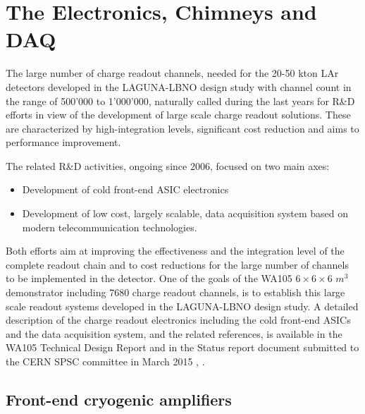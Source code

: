 \section{The Electronics, Chimneys and DAQ}
\label{sec:detectors-fd-alt-elec}

The large number of charge readout channels, needed for the 20-50 kton LAr detectors developed in the LAGUNA-LBNO design study  with channel count in the range of 500'000 to 1'000'000, naturally called during the last years for R\&D efforts in view of the development of large scale charge readout solutions. These are characterized by high-integration levels, significant cost reduction and aims to performance improvement. 

The related R\&D activities, ongoing since 2006, focused on two main axes:
\begin {itemize} 
\item{Development of cold front-end ASIC electronics}
\item{Development of low cost, largely scalable, data acquisition system based on modern telecommunication technologies.}
\end{itemize}

Both efforts aim at improving the effectiveness and the integration level of the complete readout chain and to cost reductions for the large number of channels to be implemented in the detector. One of the goals of the WA105  $6 \times 6 \times  6$ $m^3$ demonstrator including 7680 charge readout channels, is to establish this large scale readout systems developed in the  LAGUNA-LBNO design study. A detailed description of the charge readout electronics including the cold front-end ASICs and the data acquisition system, and the related references, is available in the WA105 Technical Design Report and in the Status report document submitted to the CERN SPSC committee in March 2015 \cite{TDR-WA105}, \cite{SREP-WA105} .

\subsection{Front-end cryogenic amplifiers}


